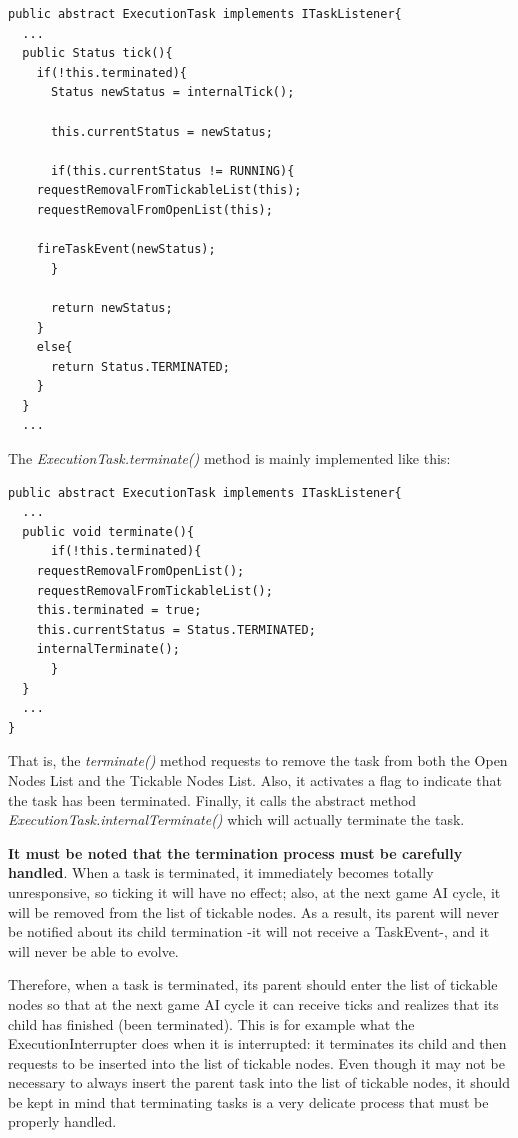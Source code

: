 \documentclass[a4paper,10pt]{article}
\begin{document}
\begin{verbatim}
public abstract ExecutionTask implements ITaskListener{
  ...
  public Status tick(){
    if(!this.terminated){
      Status newStatus = internalTick();

      this.currentStatus = newStatus;

      if(this.currentStatus != RUNNING){
	requestRemovalFromTickableList(this);
	requestRemovalFromOpenList(this);

	fireTaskEvent(newStatus);
      } 

      return newStatus;
    }
    else{
      return Status.TERMINATED;
    }
  }
  ...
\end{verbatim}

The \textit{ExecutionTask.terminate()} method is mainly implemented like this:

\begin{verbatim}
public abstract ExecutionTask implements ITaskListener{
  ...
  public void terminate(){
      if(!this.terminated){
	requestRemovalFromOpenList();
	requestRemovalFromTickableList();
	this.terminated = true;
	this.currentStatus = Status.TERMINATED;
	internalTerminate();
      }
  }
  ...
}
\end{verbatim}

That is, the \textit{terminate()} method requests to remove the task from both the Open Nodes List and the Tickable Nodes List. Also, it activates a flag to indicate that the task has been terminated. Finally, it calls the abstract method \textit{ExecutionTask.internalTerminate()} which will actually terminate the task.

\textbf{It must be noted that the termination process must be carefully handled}. When a task is terminated, it immediately becomes totally unresponsive, so ticking it will have no effect; also, at the next game AI cycle, it will be removed from the list of tickable nodes. As a result, its parent will never be notified about its child termination -it will not receive a TaskEvent-, and it will never be able to evolve. 

Therefore, when a task is terminated, its parent should enter the list of tickable nodes so that at the next game AI cycle it can receive ticks and realizes that its child has finished (been terminated). This is for example what the ExecutionInterrupter does when it is interrupted: it terminates its child and then requests to be inserted into the list of tickable nodes. Even though it may not be necessary to always insert the parent task into the list of tickable nodes, it should be kept in mind that terminating tasks is a very delicate process that must be properly handled.
\end{document}
